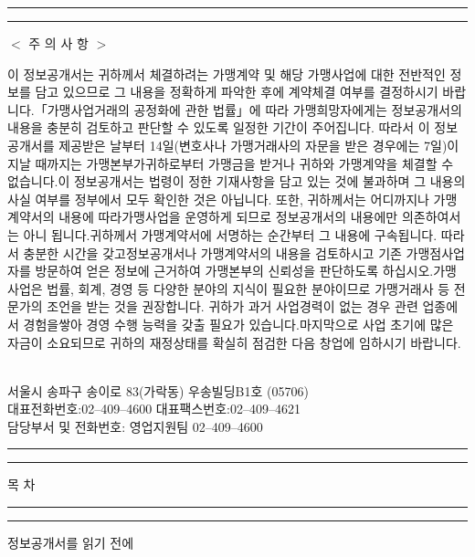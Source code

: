 \documentclass[a5paper,10pt]{oblivoir}
\newcommand\crule[3][black]{\textcolor{#1}{\rule{#2}{#3}}}
\begin{document}
\newpage
\begin{center}
\crule[red]{4cm}{0.1cm} \crule[blue]{4cm}{0.1cm}

$<$ 주 의 사 항 $>$
\end{center}
이 정보공개서는 귀하께서 체결하려는 가맹계약 및 해당 가맹사업에 대한 전반적인 정보를 담고 있으므로 그 내용을 정확하게 파악한 후에 계약체결 여부를 결정하시기 바랍니다.「가맹사업거래의 공정화에 관한 법률」에 따라 가맹희망자에게는 정보공개서의 내용을 충분히 검토하고 판단할 수 있도록 일정한 기간이 주어집니다. 따라서 이 정보공개서를 제공받은 날부터 14일(변호사나 가맹거래사의 자문을 받은 경우에는 7일)이 지날 때까지는 가맹본부가귀하로부터 가맹금을 받거나 귀하와 가맹계약을 체결할 수 없습니다.이 정보공개서는 법령이 정한 기재사항을 담고 있는 것에 불과하며 그 내용의 사실 여부를 정부에서 모두 확인한 것은 아닙니다. 또한, 귀하께서는 어디까지나 가맹계약서의 내용에 따라가맹사업을 운영하게 되므로 정보공개서의 내용에만 의존하여서는 아니 됩니다.귀하께서 가맹계약서에 서명하는 순간부터 그 내용에 구속됩니다. 따라서 충분한 시간을 갖고정보공개서나 가맹계약서의 내용을 검토하시고 기존 가맹점사업자를 방문하여 얻은 정보에 근거하여 가맹본부의 신뢰성을 판단하도록 하십시오.가맹사업은 법률, 회계, 경영 등 다양한 분야의 지식이 필요한 분야이므로 가맹거래사 등 전문가의 조언을 받는 것을 권장합니다. 귀하가 과거 사업경력이 없는 경우 관련 업종에서 경험을쌓아 경영 수행 능력을 갖출 필요가 있습니다.마지막으로 사업 초기에 많은 자금이 소요되므로 귀하의 재정상태를 확실히 점검한 다음 창업에 임하시기 바랍니다.

\rule{0cm}{1cm}
\\
서울시 송파구 송이로 83(가락동) 우송빌딩B1호 (05706)\\
대표전화번호:02--409--4600 대표팩스번호:02--409--4621\\
담당부서 및 전화번호: 영업지원팀 02--409--4600

\newpage
\begin{center}
\crule[red]{4cm}{0.1cm} \crule[blue]{4cm}{0.1cm}

 목 차
\end{center}





\newpage
\begin{center}
\crule[red]{4cm}{0.1cm} \crule[blue]{4cm}{0.1cm}

정보공개서를 읽기 전에 
\end{center}
\end{document}
